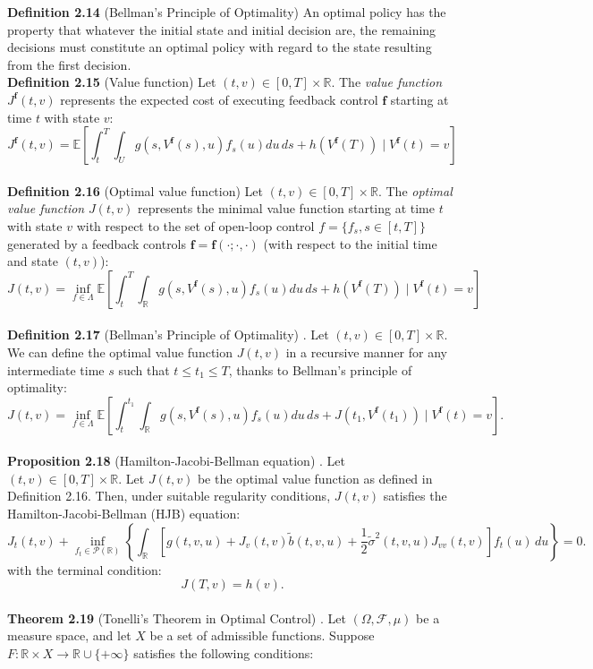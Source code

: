 \documentclass[oneside, a4paper, onecolumn, 11pt]{article}
\begin{document}
\textbf{Definition 2.14} (Bellman's Principle of Optimality) \cite{Bellman1957} 
An optimal policy has the property that whatever the initial state and initial decision are, the remaining decisions must constitute an optimal policy with regard to the state resulting from the first decision. 
\\\textbf{Definition 2.15} (Value function) \cite{Bellman1957}
Let $(t,v) \in [0,T] \times \mathbb{R}$. The \textit{value function} \( J^{\boldsymbol{f}}(t, v) \) represents the  expected cost of executing feedback control $\boldsymbol{f}$ starting at time \( t \) with state \( v \):
\[
J^{\boldsymbol{f}}(t, v) = \mathbb{E}\left[ \int_{t}^{T} \int_{U} g(s, V^{\boldsymbol{f}}(s), u) f_s(u)du \, ds + h(V^{\boldsymbol{f}}(T)) \mid V^{\boldsymbol{f}}(t) = v  \right] 
\]
\\\textbf{Definition 2.16} (Optimal value function) \cite{Bellman1957}
Let $(t,v) \in [0,T] \times \mathbb{R}$. The \textit{optimal value function} \( J(t, v) \) represents the minimal value function starting at time \( t \) with state \( v \) with respect to the set of open-loop control $f =\{f_s, s\in[t,T]\}$ generated by a feedback controls $\boldsymbol{f} = \boldsymbol{f}(\cdot;\cdot, \cdot)$ (with respect to the initial time and state $(t,v)$):
\[
J(t, v) = \inf_{f \in \Lambda} \mathbb{E}\left[ \int_{t}^{T} \int_{\mathbb{R}} g(s, V^{\boldsymbol{f}}(s), u) f_s(u)du \, ds + h(V^{\boldsymbol{f}}(T)) \mid V^{\boldsymbol{f}}(t) = v  \right] 
\]
\\\textbf{Definition 2.17} (Bellman's Principle of Optimality) \cite{Bellman1957}. Let $(t,v) \in [0,T] \times \mathbb{R}$.
We can define the optimal value function \( J(t, v) \) in a recursive manner for any intermediate time \( s \) such that \( t \leq t_1 \leq T \), thanks to Bellman's principle of optimality:
\[
J(t,v) = \inf_{f \in \Lambda} \mathbb{E}\left[ \int_{t}^{t_1} \int_{\mathbb{R}} g(s, V^{\boldsymbol{f}}(s), u) f_s(u) du \, ds + J(t_1, V^{\boldsymbol{f}}(t_1)) \mid V^{\boldsymbol{f}}(t) = v \right].
\]  
\\ \textbf{Proposition 2.18} (Hamilton-Jacobi-Bellman equation) \cite{Yong1999}. Let $(t,v) \in [0,T] \times \mathbb{R}$. 
Let \( J(t,v) \) be the optimal value function as defined in Definition 2.16. Then, under suitable regularity conditions, \( J(t,v) \) satisfies the Hamilton-Jacobi-Bellman (HJB) equation:
\[
J_t(t,v) + \inf_{f_t \in \mathcal{P}(\mathbb{R})} \left\{ \int_{\mathbb{R}} \left[ g(t, v, u) 
+ J_v(t,v) \tilde{b}(t, v, u) 
+ \frac{1}{2} \tilde{\sigma}^2(t, v, u) J_{vv}(t, v) 
\right] f_t(u) \, du \right\} = 0.
\]
with the terminal condition:
\[
J(T, v) = h(v).
\] 
\\\textbf{Theorem 2.19} (Tonelli's Theorem in Optimal Control) \cite{Folland1999}. 
Let \( (\Omega, \mathcal{F}, \mu) \) be a measure space, and let \( X \) be a set of admissible functions. Suppose \( F: \mathbb{R} \times X \to \mathbb{R} \cup \{+\infty\} \) satisfies the following conditions:  
\end{document}
